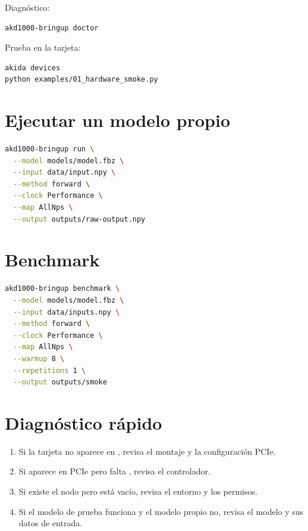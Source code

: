 Diagnóstico:

\begin{lstlisting}[language=bash]
akd1000-bringup doctor
\end{lstlisting}

Prueba en la tarjeta:

\begin{lstlisting}[language=bash]
akida devices
python examples/01_hardware_smoke.py
\end{lstlisting}

\section{Ejecutar un modelo propio}

\begin{lstlisting}[language=bash]
akd1000-bringup run \
  --model models/model.fbz \
  --input data/input.npy \
  --method forward \
  --clock Performance \
  --map AllNps \
  --output outputs/raw-output.npy
\end{lstlisting}

\section{Benchmark}

\begin{lstlisting}[language=bash]
akd1000-bringup benchmark \
  --model models/model.fbz \
  --input data/inputs.npy \
  --method forward \
  --clock Performance \
  --map AllNps \
  --warmup 8 \
  --repetitions 1 \
  --output outputs/smoke
\end{lstlisting}

\section{Diagnóstico rápido}

\begin{enumerate}
  \item Si la tarjeta no aparece en , revisa el montaje y la configuración PCIe.
  \item Si aparece en PCIe pero falta , revisa el controlador.
  \item Si existe el nodo pero  está vacío, revisa el entorno y los permisos.
  \item Si el modelo de prueba funciona y el modelo propio no, revisa el modelo y sus datos de entrada.
\end{enumerate}